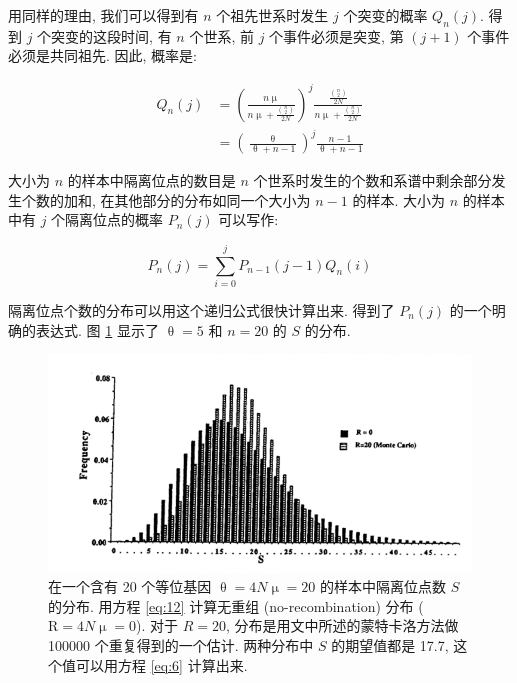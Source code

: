 \documentclass[12pt]{article}
\begin{document}
用同样的理由, 我们可以得到有 $n$ 个祖先世系时发生 $j$ 个突变的概率 $Q_{n}(j)$.
得到 $j$ 个突变的这段时间, 有 $n$ 个世系, 前 $j$ 个事件必须是突变, 第 $(j+1)$ 个事件必须是共同祖先.
因此, 概率是:

\begin{equation} \label{eq:11}
    \begin{split}
        Q_{n}(j) & = \left (\frac{n\upmu}{n\upmu + \frac{\binom{n}{2}}{2N}} \right )^{j} \frac{\frac{\binom{n}{2}}{2N}}{n\upmu + \frac{\binom{n}{2}}{2N}} \\
        & = \left (\frac{\uptheta}{\uptheta + n - 1} \right )^{j} \frac{n-1}{\uptheta + n - 1}
    \end{split}
\end{equation}

大小为 $n$ 的样本中隔离位点的数目是 $n$ 个世系时发生的个数和系谱中剩余部分发生个数的加和,
在其他部分的分布如同一个大小为 $n-1$ 的样本.
大小为 $n$ 的样本中有 $j$ 个隔离位点的概率 $P_{n}(j)$ 可以写作:

\begin{equation} \label{eq:12}
    P_{n}(j) = \sum_{i=0}^{j} P_{n-1}(j-1) Q_{n}(i)
\end{equation}

隔离位点个数的分布可以用这个递归公式很快计算出来. \textcite{tavare1984} 得到了 $P_{n}(j)$ 的一个明确的表达式.
图 \ref{fig:2} 显示了 $\uptheta=5$ 和 $n=20$ 的 $S$ 的分布.

\begin{figure}
    \centering
    \includegraphics{coalescent-process.images/image2.png}
    \caption{
        在一个含有 20 个等位基因 $\uptheta = 4N\upmu = 20$ 的样本中隔离位点数 $S$ 的分布.
        用方程 \ref{eq:12} 计算无重组 (no-recombination) 分布 ($\mathrm{R}=4N\upmu =0$).
        对于 $R=20$, 分布是用文中所述的蒙特卡洛方法做 100000 个重复得到的一个估计.
        两种分布中 $S$ 的期望值都是 17.7, 这个值可以用方程 \ref{eq:6} 计算出来.
    }
    \label{fig:2}
\end{figure}
\end{document}
